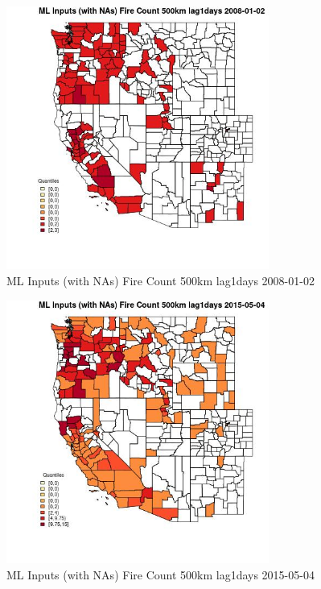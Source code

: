 \clearpage 

\begin{figure} 
\centering  
\includegraphics[width=0.77\textwidth]{Code_Outputs/Report_ML_input_PM25_Step4_part_e_de_duplicated_aves_compiled_2019-05-18wNAs_CountyFire_Count_500km_lag1daysMean2008-01-02_2008-01-02.jpg} 
\caption{\label{fig:Report_ML_input_PM25_Step4_part_e_de_duplicated_aves_compiled_2019-05-18wNAsCountyFire_Count_500km_lag1daysMean2008-01-02_2008-01-02}ML Inputs (with NAs) Fire Count 500km lag1days 2008-01-02} 
\end{figure} 
 

\begin{figure} 
\centering  
\includegraphics[width=0.77\textwidth]{Code_Outputs/Report_ML_input_PM25_Step4_part_e_de_duplicated_aves_compiled_2019-05-18wNAs_CountyFire_Count_500km_lag1daysMean2015-05-04_2015-05-04.jpg} 
\caption{\label{fig:Report_ML_input_PM25_Step4_part_e_de_duplicated_aves_compiled_2019-05-18wNAsCountyFire_Count_500km_lag1daysMean2015-05-04_2015-05-04}ML Inputs (with NAs) Fire Count 500km lag1days 2015-05-04} 
\end{figure} 
 

